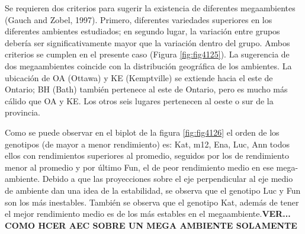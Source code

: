 Se requieren dos criterios para sugerir la existencia de diferentes megaambientes (Gauch and Zobel, 1997). Primero, diferentes variedades superiores en los diferentes ambientes estudiados; en segundo lugar, la variación entre grupos debería ser significativamente mayor que la variación dentro del grupo.  Ambos criterios se cumplen en el presente caso (Figura \ref{fig:fig4125}). La sugerencia de dos megaambientes coincide con la distribución geográfica de los ambientes. La ubicación de OA (Ottawa) y KE (Kemptville) se extiende hacia el este de Ontario; BH (Bath) también pertenece al este de Ontario, pero es mucho más cálido que OA y KE. Los otros seis lugares pertenecen al oeste o sur de la provincia.



Como se puede observar en el biplot de la figura \ref{fig:fig4126} el orden de los genotipos (de mayor a menor rendimiento) es: Kat, m12, Ena, Luc, Ann todos ellos con rendimientos superiores al promedio, seguidos por los de rendimiento menor al promedio y por último Fun, el de peor rendimiento medio en ese mega-ambiente.
Debido a que las proyecciones sobre el eje perpendicular al eje medio de ambiente dan una idea de la estabilidad, se observa que el genotipo Luc y Fun son los más inestables. También se
observa que el genotipo Kat, además de tener el mejor rendimiento medio es de los más estables en el megaambiente.\textbf{VER... COMO HCER AEC SOBRE UN MEGA AMBIENTE SOLAMENTE}

